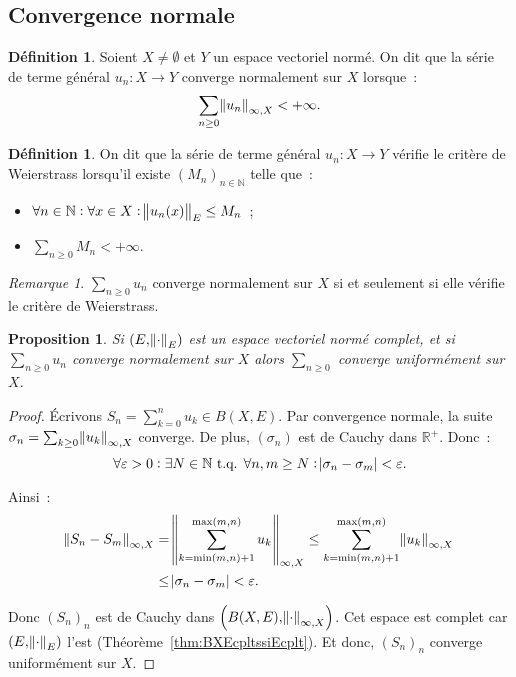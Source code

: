 \documentclass{report}
\newtheorem{prp}[thm]{Proposition}
\theoremstyle{definition}
\newtheorem{déf}[thm]{Définition}
\theoremstyle{remark}
\newtheorem*{rmq}{Remarque}
\newcommand{\R}{\mathbb R}
\newcommand{\Rp}{\R^{+}}
\newcommand{\N}{\mathbb N}
\newcommand{\tq}{\text{ t.q. }}
\newcommand{\seq}[3]{\left(#1_{#2}\right)_{#2 \in #3}}
\newcommand{\pinfty}{{+\infty}}
\newcommand{\evn}{espace vectoriel normé}
\newcommand{\evnc}{{\evn} complet}
\begin{document}
		\subsection{Convergence normale}
			\begin{déf} Soient $X \neq \emptyset$ et $Y$ un \evn. On dit que la série de terme général $u_n : X \to Y$ converge normalement sur $X$ lorsque~:
			\[\sum_{n \geq 0}\norm {u_n}_{\infty, X} < \pinfty.\]
			\end{déf}

			\begin{déf} On dit que la série de terme général $u_n : X \to Y$ vérifie le critère de Weierstrass lorsqu'il existe $\seq Mn\N$ telle que~:
			\begin{itemize}
				\item $\displaystyle \forall n \in \N : \forall x \in X : \norm {u_n(x)}_E \leq M_n$~;
				\item $\displaystyle \sum_{n \geq 0}M_n < \pinfty$.
			\end{itemize}
			\end{déf}

			\begin{rmq} $\sum_{n \geq 0}u_n$ converge normalement sur $X$ si et seulement si elle vérifie le critère de Weierstrass.
			\end{rmq}

			\begin{prp} Si $(E, \norm \cdot_E)$ est un \evnc, et si $\sum_{n \geq 0}u_n$ converge normalement sur $X$ alors $\sum_{n \geq 0}$
			converge uniformément sur $X$.
			\end{prp}

			\begin{proof} Écrivons $S_n = \sum_{k=0}^nu_k \in B(X, E)$. Par convergence normale, la suite $\sigma_n = \sum_{k \geq 0}\norm {u_k}_{\infty, X}$
			converge. De plus, $(\sigma_n)$ est de Cauchy dans $\Rp$. Donc~:
			\[\forall \varepsilon > 0 : \exists N \in \N \tq \forall n, m \geq N : \abs {\sigma_n - \sigma_m} < \varepsilon.\]

			Ainsi~:
			\begin{align*}
				\norm {S_n - S_m}_{\infty, X} &= \norm {\sum_{k=\min(m, n)+1}^{\max(m, n)}u_k}_{\infty, X} \leq \sum_{k=\min(m, n)+1}^{\max(m, n)}\norm {u_k}_{\infty, X} \\
				&\leq \abs {\sigma_n - \sigma_m} < \varepsilon.
			\end{align*}

			Donc $(S_n)_n$ est de Cauchy dans $\left(B(X, E), \norm \cdot_{\infty, X}\right)$. Cet espace est complet car $(E, \norm \cdot_E)$ l'est
			(Théorème~\ref{thm:BXEcpltssiEcplt}). Et donc, $(S_n)_n$ converge uniformément sur $X$.
			\end{proof}
\end{document}
